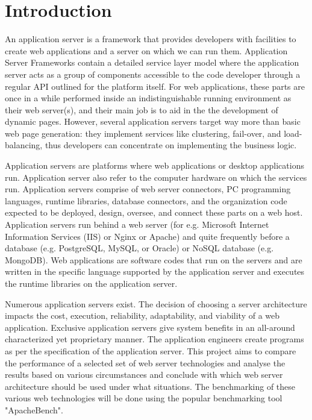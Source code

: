 \documentclass[../thesis.tex]{subfiles}
\begin{document}
\section{Introduction}
An application server is a framework that provides developers with facilities to create web applications and a server on which we can run them. Application Server Frameworks contain a detailed service layer model where the application server acts as a group of components accessible to the code developer through a regular API outlined for the platform itself. For web applications, these parts are once in a while performed inside an indistinguishable running environment as their web server(s), and their main job is to aid in the the development of dynamic pages. However, several application servers target way more than basic web page generation: they implement services like clustering, fail-over, and load-balancing, thus developers can concentrate on implementing the business logic.
\linebreak

Application servers are platforms where web applications or desktop applications run. Application server also refer to the computer hardware on which the services run. Application servers comprise of web server connectors, PC programming languages, runtime libraries, database connectors, and the organization code expected to be deployed, design, oversee, and connect these parts on a web host. Application servers run behind a web server (for e.g. Microsoft Internet Information Services (IIS) or Nginx or Apache) and quite frequently before a database (e.g. PostgreSQL, MySQL, or Oracle) or NoSQL database (e.g. MongoDB). Web applications are software codes that run on the servers and are written in the specific language supported by the application server and executes the runtime libraries on the application server.
\linebreak

Numerous application servers exist. The decision of choosing a server architecture impacts the cost, execution, reliability, adaptability, and viability of a web application. Exclusive application servers give system benefits in an all-around characterized yet proprietary manner. The application engineers create programs as per the specification of the application server. This project aims to compare the performance of a selected set of web server technologies and analyse the results based on various circumstances and conclude with which web server architecture should be used under what situations. The benchmarking of these various web technologies will be done using the popular benchmarking tool "ApacheBench".
\clearpage
\end{document}
